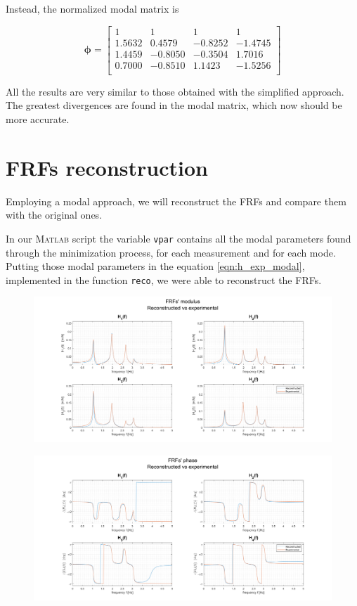 \documentclass[a4paper,12pt,oneside]{article}
\begin{document}
Instead, the normalized modal matrix is

\[
	\bm{\phi} =	\begin{bmatrix}
								1				& 1				& 1				& 1 \\
								1.5632	& 0.4579	& -0.8252	& -1.4745 \\
								1.4459	& -0.8050 & -0.3504	& 1.7016 \\
								0.7000	& -0.8510 & 1.1423	& -1.5256 \\
							\end{bmatrix}
\]

All the results are very similar to those obtained with the simplified approach. The greatest divergences are found in the modal matrix, which now should be more accurate.


\section{FRFs reconstruction}

Employing a modal approach, we will reconstruct the FRFs and compare them with the original ones.

In our \textsc{Matlab} script the variable \lstinline!vpar! contains all the modal parameters found through the minimization process, for each measurement and for each mode. Putting those modal parameters in the equation \eqref{eqn:h_exp_modal}, implemented in the function \lstinline!reco!, we were able to reconstruct the FRFs. 

\begin{figure}[H]
	\hspace{-70pt}
	\includegraphics[scale=0.4]{frfs_rec_vs_exp_modulus}
\end{figure}

\begin{figure}[H]
	\hspace{-70pt}
	\includegraphics[scale=0.4]{frfs_rec_vs_exp_phase}
\end{figure}
\end{document}

